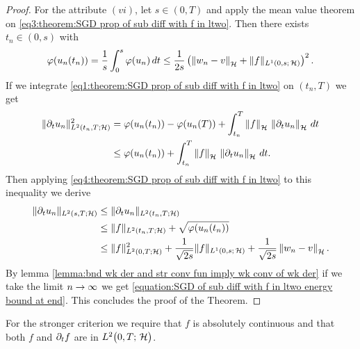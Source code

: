 \begin{proof}
	For the attribute $ (vi) $, let $ s\in (0,T) $ and apply the mean value theorem on 
	\eqref{eq3:theorem:SGD prop of sub diff with f in ltwo}.
	Then there exists $ t_n\in (0,s) $ with
	\begin{align}\label{eq4:theorem:SGD prop of sub diff with f in ltwo}
		\varphi(u_n(t_n))
		=\frac{1}{s}\int_0^s\varphi(u_n)\,dt
		\leq \frac{1}{2s}\left(\left\Vert w_n-v\right\Vert_{\mathcal{H}}
		+\Vert f\Vert_{L^1(0,s;\,\mathcal{H})}\right)^2.
	\end{align}
	If we integrate \eqref{eq1:theorem:SGD prop of sub diff with f in ltwo}
	on $ (t_n,T) $ we get
	\begin{align*}
		\Vert \partial_t u_n\Vert_{L^2(t_n,T;\mathcal{H})}^2
		&= \varphi(u_n(t_n))-\varphi(u_n(T))
		+\int_{t_n}^T\left\Vert f\right\Vert_{\mathcal{H}}\,\left\Vert \partial_t u_n\right\Vert_{\mathcal{H}}\,dt\\
		&\leq \varphi(u_n(t_n))
		+\int_{t_n}^T\left\Vert f\right\Vert_{\mathcal{H}}\,\left\Vert \partial_t u_n\right\Vert_{\mathcal{H}}\,dt.
	\end{align*}
	Then applying \eqref{eq4:theorem:SGD prop of sub diff with f in ltwo}
	to this inequality we derive
	\begin{align*}
		\Vert \partial_t u_n\Vert_{L^2(s,T;\mathcal{H})}
		&\leq \Vert \partial_t u_n\Vert_{L^2(t_n,T;\mathcal{H})}\\
		&\leq \Vert f\Vert_{L^2(t_n,T;\mathcal{H})}+\sqrt{\varphi(u_n(t_n))}\\
		&\leq \Vert f\Vert_{L^2(0,T;\mathcal{H})}^2
		+\frac{1}{\sqrt{2s}}\Vert f\Vert_{L^1(0,s;\,\mathcal{H})}
		+\frac{1}{\sqrt{2s}}\left\Vert w_n-v\right\Vert_{\mathcal{H}}.
	\end{align*}
	By lemma \ref{lemma:bnd wk der and str conv fun imply wk conv of wk der}
	if we take the limit $ n\rightarrow\infty $ we get 
	\eqref{equation:SGD of sub diff with f in ltwo energy bound at end}.
	This concludes the proof of the Theorem.
\end{proof}

For the stronger criterion we require that $ f $ is absolutely continuous
and that both $ f $ and $ \partial_t f $ are in $ L^{2}\big(0,T;\,\mathcal{H}\big) $.


